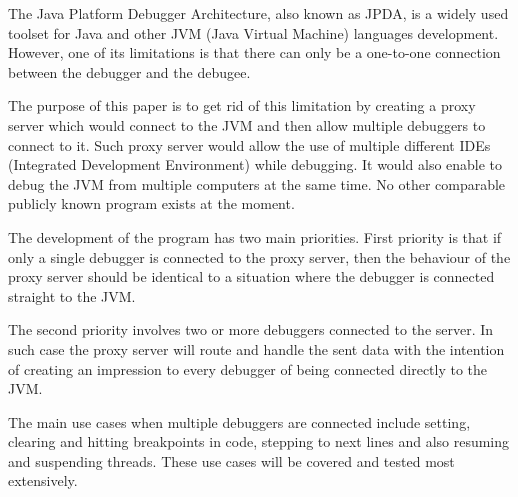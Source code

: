 \documentclass[..thesis.tex]{subfiles}
\begin{document}

The Java Platform Debugger Architecture, also known as JPDA, is a widely used toolset for Java and other JVM (Java Virtual Machine) languages development.
However, one of its limitations is that there can only be a one-to-one connection between the debugger and the debugee.


The purpose of this paper is to get rid of this limitation by creating a proxy server which would connect to the JVM and then allow multiple debuggers to connect to it. 
Such proxy server would allow the use of multiple different IDEs (Integrated Development Environment) while debugging. It would also enable to debug the JVM from multiple computers at the same time. 
No other comparable publicly known program exists at the moment.


The development of the program has two main priorities. 
First priority is that if only a single debugger is connected to the proxy server, then the behaviour of the proxy server should be identical to a situation where the debugger is connected straight to the JVM.

The second priority involves two or more debuggers connected to the server. In such case the proxy server will route and handle the sent data with the intention of creating an impression to every debugger of being connected directly to the JVM.

The main use cases when multiple debuggers are connected include setting, clearing and hitting breakpoints in code, stepping to next lines and also resuming and suspending threads.
These use cases will be covered and tested most extensively.
\end{document}
